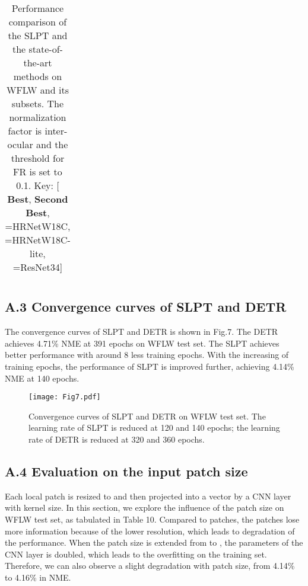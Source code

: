 \documentclass[10pt,twocolumn,letterpaper]{article}
\begin{document}
\begin{table}[H]
\begin{tabular}{m{1.7cm}<{\centering}|m{2.6cm}<{\centering}|m{1.2cm}<{\centering}|m{1.2cm}<{\centering}|m{1.4cm}<{\centering}|m{1.6cm}<{\centering}|m{1.3cm}<{\centering}|m{1.3cm}<{\centering}|m{1.2cm}<{\centering}}
	\end{tabular}
	\caption{Performance comparison of the SLPT and the state-of-the-art methods on WFLW and its subsets. The normalization factor is inter-ocular and the threshold for FR is set to 0.1. Key: [{\color{red} \textbf{Best}}, {\color{blue} \textbf{Second Best}}, =HRNetW18C, =HRNetW18C-lite, =ResNet34]}
	\label{Tabal9}
\end{table}

\newpage

\subsection*{A.3 Convergence curves of SLPT and DETR}
The convergence curves of SLPT and DETR is shown in Fig.7. The DETR achieves 4.71\% NME at 391 epochs on WFLW test set. The SLPT achieves better performance with around 8 less training epochs. With the increasing of training epochs, the performance of SLPT is improved further, achieving 4.14\% NME at 140 epochs.

\begin{figure}[H]
	\centering
	\texttt{[image: Fig7.pdf]}
	\caption{Convergence curves of SLPT and DETR on WFLW test set. The learning rate of SLPT is reduced at 120 and 140 epochs; the learning rate of DETR is reduced at 320 and 360 epochs.}
	\label{fig7}
\end{figure}

\subsection*{A.4 Evaluation on the input patch size}

Each local patch is resized to  and then projected into a vector by a CNN layer with  kernel size. In this section, we explore the influence of the patch size on WFLW test set, as tabulated in Table 10. Compared to  patches, the  patches lose more information because of the lower resolution, which leads to degradation of the performance. When the patch size is extended from  to , the parameters of the CNN layer is doubled, which leads to the overfitting on the training set. Therefore, we can also observe a slight degradation with  patch size, from 4.14\% to 4.16\% in NME.
\end{document}
